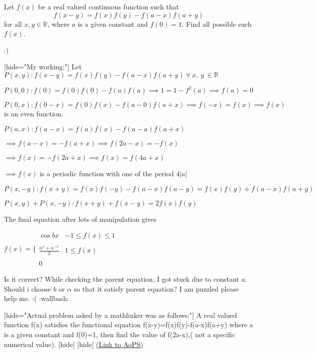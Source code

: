 \begin{problem}
	Let $f(x)$ be a real valued continuous function such that \[f(x-y)=f(x)f(y)-f(a-x)f(a+y)\] for all $x,y \in \mathbb{R}$, where $a$ is a given constant and $f(0)=1$. Find all possible such $f(x)$.

 :)

[hide="My working:"]
Let $P(x,y):f(x-y)=f(x)f(y)-f(a-x)f(a+y)\ \forall\ x,\ y\ \in \mathbb{R}$

$P(0,0):f(0)=f(0)f(0)-f(a)f(a)\implies 1=1-f^2(a)\implies f(a)=0$

$P(0,x):f(0-x)=f(0)f(x)-f(a-0)f(a+x)\implies f(-x)=f(x)\implies f(x)$ is an even function.

$P(a,x):f(a-x)=f(a)f(x)-f(a-a)f(a+x)$

$\implies \boxed{f(a-x)=-f(a+x)}\implies f(2a-x)=-f(x)$

$\implies f(x)=-f(2a+x)\implies \boxed{f(x)=f(4a+x)}$

$\implies f(x)$ is a periodic function with one of the period $4|a|$

$P(x,-y):f(x+y)=f(x)f(-y)-f(a-x)f(a-y)=f(x)f(y)+f(a-x)f(a+y)$

$P(x,y)+P(x,-y):\boxed{\boxed{f(x+y)+f(x-y)=2f(x)f(y)}}$  

The final equation after lots of manipulation gives  
 
$f(x)=\{\begin{array}{cc}{\cos bx} & {-1\le f(x)\le1}\\ \\{\frac{\alpha^x+\alpha^{-x}}{2}}&{1\le f(x)}\\ \\0\end{array}$

Is it correct? While checking the parent equation, I got stuck due to constant $a$. Should i choose $b$ or $\alpha$ so that it satisfy parent equation? I am puzzled please help me.  :(  :wallbash:       

[hide="Actual problem asked by a mathlinker was as follows:"] 
A real valued function f(x) satisfies the functional equation f(x-y)=f(x)f(y)-f(a-x)f(a+y) where a is a given constant and f(0)=1, then find the value of f(2a-x),( not a specific numerical value).
[\/hide]
[\/hide]
	\flushright \href{https://artofproblemsolving.com/community/c6h391364}{(Link to AoPS)}
\end{problem}



